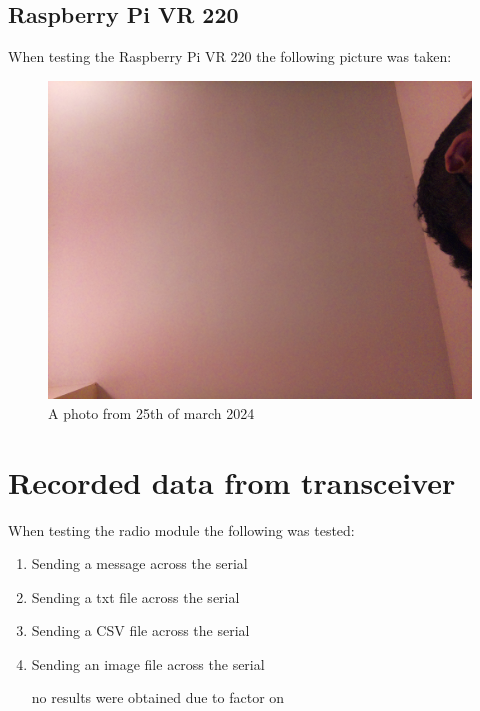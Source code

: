 \subsection{Raspberry Pi VR 220}
When testing  the Raspberry Pi VR 220 the following picture was taken:
\begin{figure}[h!]
    \centering
    \includegraphics[width=0.4\linewidth]{Images/camera_output_2024-03-21_21-43-16.png}
    \caption{A photo from 25th of march 2024 }
    \label{A photo from 25th of march 2024}
\end{figure}

\section{Recorded data from transceiver}
When testing  the radio module the following was tested:
\begin{enumerate}
    \item Sending a message across the serial

    \item Sending a txt file across the serial

    \item Sending a CSV file across the serial


    \item Sending an image file across the serial

    no results were obtained due to  factor on \pageref{Discussion of Lora module}
\end{enumerate}

